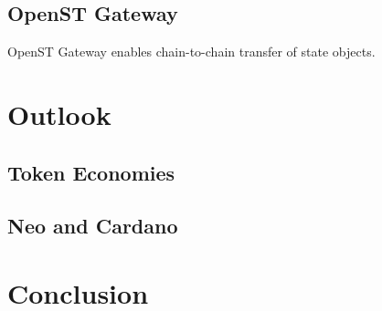 \documentclass[12pt,a4paper]{article}
\begin{document}

\subsection{OpenST Gateway}
\label{subsec:gateway}

OpenST Gateway enables chain-to-chain transfer of state objects.

%
%
\section{Outlook}

\subsection{Token Economies}
\subsection{Neo and Cardano}

%
%
\section{Conclusion}



\end{document}
